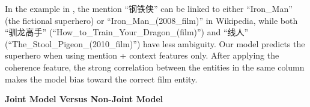 In the example in , the mention 
``钢铁侠'' can be linked to either
``Iron\_Man'' (the fictional superhero) or ``Iron\_Man\_(2008\_film)'' 
in Wikipedia, while both ``驯龙高手'' (``How\_to\_Train\_Your\_Dragon\_(film)'') and
``线人'' (``The\_Stool\_Pigeon\_(2010\_film)'') have less ambiguity.
Our model predicts the superhero when using mention + context features only.
After applying the coherence feature, 
the strong correlation between the entities in the same column
makes the model bias toward the correct film entity.




\noindent
\textbf{Joint Model Versus Non-Joint Model}

